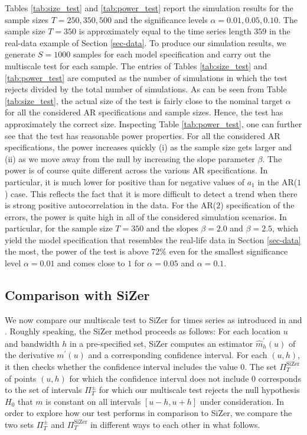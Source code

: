 Tables \ref{tab:size_test} and \ref{tab:power_test} report the simulation results for the sample sizes $T=250,350,500$ and the significance levels $\alpha = 0.01, 0.05, 0.10$. The sample size $T = 350$ is approximately equal to the time series length $359$ in the real-data example of Section \ref{sec-data}. To produce our simulation results, we generate $S=1000$ samples for each model specification and carry out the multiscale test for each sample. The entries of Tables \ref{tab:size_test} and \ref{tab:power_test} are computed as the number of simulations in which the test rejects divided by the total number of simulations. As can be seen from Table \ref{tab:size_test}, the actual size of the test is fairly close to the nominal target $\alpha$ for all the considered AR specifications and sample sizes. Hence, the test has approximately the correct size. Inspecting Table \ref{tab:power_test}, one can further see that the test has reasonable power properties. For all the considered AR specifications, the power increases quickly (i) as the sample size gets larger and (ii) as we move away from the null by increasing the slope parameter $\beta$. The power is of course quite different across the various AR specifications. In particular, it is much lower for positive than for negative values of $a_1$ in the AR($1$) case. This reflects the fact that it is more difficult to detect a trend when there is strong positive autocorrelation in the data. For the AR($2$) specification of the errors, the power is quite high in all of the considered simulation scenarios. In particular, for the sample size $T=350$ and the slopes $\beta = 2.0$ and $\beta = 2.5$, which yield the model specification that resembles the real-life data in Section \ref{sec-data} the most, the power of the test is above $72\%$ even for the smallest significance level $\alpha = 0.01$ and comes close to $1$ for $\alpha = 0.05$ and $\alpha = 0.1$.


\subsection{Comparison with SiZer}\label{subsec-sim-2}


We now compare our multiscale test to SiZer for times series as introduced in \cite{Rondonotti2004} and \cite{Rondonotti2007}. Roughly speaking, the SiZer method proceeds as follows: For each location $u$ and bandwidth $h$ in a pre-specified set, SiZer computes an estimator $\widehat{m}_h^\prime(u)$ of the derivative $m^\prime(u)$ and a corresponding confidence interval. For each $(u,h)$, it then checks whether the confidence interval includes the value $0$. The set $\Pi_T^{\text{SiZer}}$ of points $(u,h)$ for which the confidence interval does not include $0$ corresponds to the set of intervals $\Pi_T^\pm$ for which our multiscale test rejects the null hypothesis $H_0$ that $m$ is constant on all intervals $[u-h,u+h]$ under consideration. %
In order to explore how our test performs in comparison to SiZer, we compare the two sets $\Pi_T^\pm$ and $\Pi_T^{\text{SiZer}}$ in different ways to each other in what follows. 


